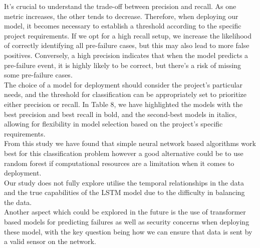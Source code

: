 \documentclass{article}
\begin{document}
It's crucial to understand the trade-off between precision and recall. As one metric increases, the other tends to decrease. Therefore, when deploying our model, it becomes necessary to establish a threshold according to the specific project requirements. If we opt for a high recall setup, we increase the likelihood of correctly identifying all pre-failure cases, but this may also lead to more false positives. Conversely, a high precision indicates that when the model predicts a pre-failure event, it is highly likely to be correct, but there's a risk of missing some pre-failure cases.\\

The choice of a model for deployment should consider the project's particular needs, and the threshold for classification can be appropriately set to prioritize either precision or recall. In Table 8, we have highlighted the models with the best precision and best recall in bold, and the second-best models in italics, allowing for flexibility in model selection based on the project's specific requirements. \\

From this study we have found that simple neural network based algorithms work best for this classification problem however a good alternative could be to use random forest if computational resources are a limitation when it comes to deployment. \\

Our study does not fully explore utilise the temporal relationships in the data and the true capabilities of the LSTM model due to the difficulty in balancing the data. \\

Another aspect which could be explored in the future is the use of transformer based models for predicting failures as well as security concerns when deploying these model, with the key question being how we can ensure that data is sent by a valid sensor on the network.

\newpage



\end{document}
